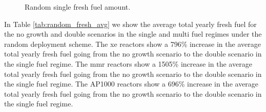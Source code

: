 

\begin{figure}[H]
    \hfill
    \caption{Random single fresh fuel amount.}
    \label{fig:random_of_fresh}
\end{figure}




In Table \ref{tab:random_fresh_avg} we show the average total yearly fresh fuel for the no growth and double scenarios in the single and multi fuel regimes under the random deployment scheme. The \gls{xe} reactors show a 796\% increase in the average total yearly fresh fuel going from the no growth scenario to the double scenario in the single fuel regime. The \gls{mmr} reactors show a 1505\% increase in the average total yearly fresh fuel going from the no growth scenario to the double scenario in the single fuel regime. The AP1000 reactors show a 696\% increase in the average total yearly fresh fuel going from the no growth scenario to the double scenario in the single fuel regime.

